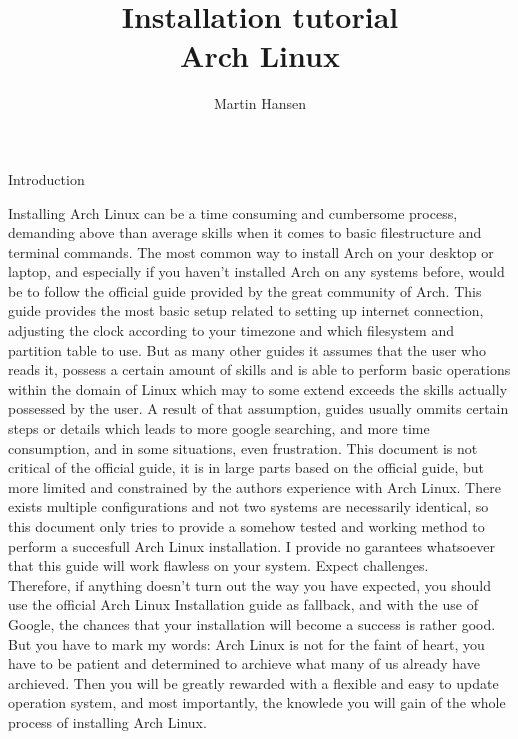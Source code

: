 \documentclass{article}
\title{Installation tutorial \\ \small Arch Linux}
\author{Martin Hansen}
\begin{document}
	\frenchspacing
	
	\maketitle
	\pagebreak
	\begin{center}
		\Large Introduction
	\end{center}
	
	Installing Arch Linux can be a time consuming and cumbersome process, demanding above than average skills when it comes to basic filestructure and terminal commands. The most common way to install Arch on your desktop or laptop, and especially if you haven't installed Arch on any systems before, would be to follow the official guide provided by the great community of Arch. This guide provides the most basic setup related to setting up internet connection, adjusting the clock according to your timezone and which filesystem and partition table to use. But as many other guides it assumes that the user who reads it, possess a certain amount of skills and is able to perform basic operations within the domain of Linux which may to some extend exceeds the skills actually possessed by the user. A result of that assumption, guides usually ommits certain steps or details which leads to more google searching, and more time consumption, and in some situations, even frustration. This document is not critical of the official guide, it is in large parts based on the official guide, but more limited and constrained by the authors experience with Arch Linux. There exists multiple configurations and not two systems are necessarily identical, so this document only tries to provide a somehow tested and working method to perform a succesfull Arch Linux installation. I provide no garantees whatsoever that this guide will work flawless on your system. Expect challenges.\\
	
	Therefore, if anything doesn't turn out the way you have expected, you should use the official Arch Linux Installation guide as fallback, and with the use of Google, the chances that your installation will become a success is rather good. But you have to mark my words: Arch Linux is not for the faint of heart, you have to be patient and determined to archieve what many of us already have archieved. Then you will be greatly rewarded with a flexible and easy to update operation system, and most importantly, the knowlede you will gain of the whole process of installing Arch Linux.\\
	
\end{document}
